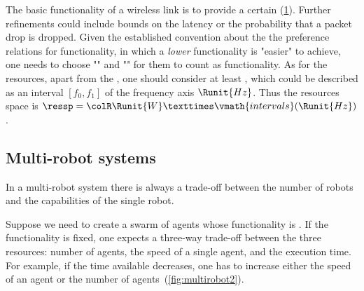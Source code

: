\begin{example}
  The basic functionality of a wireless link is to provide
  a certain  (\cref{fig:networklink}). Further refinements could include bounds
  on the latency or the probability that a packet drop is dropped. Given
  the established convention about the the preference relations for
  functionality, in which a \emph{lower} functionality is "easier"
  to achieve, one needs to choose ""
  and "" for them
  to count as functionality. As for the resources, apart from the , one should consider at least ,
  which could be described as an interval $[f_0,f_1]$ of the frequency
  axis $\Runit{Hz}$. Thus the resources space is $\ressp=\colR\Runit{W}×\vmath{intervals}(\Runit{Hz})$.
\end{example}

\begin{figure}[h]
  \begin{center}
  \end{center}
  \caption{ \label{fig:networklink}}
\end{figure}

\subsection{Multi-robot systems}

In a multi-robot system there is always a trade-off between the number
of robots and the capabilities of the single robot.
\begin{example}
  Suppose we need to create a swarm of agents whose functionality is
  . If the functionality is fixed, one expects
  a three-way trade-off between the three resources: number of agents,
  the speed of a single agent, and the execution time. For example,
  if the time available decreases, one has to increase either the speed
  of an agent or the number of agents~(\cref{fig:multirobot2}).
\end{example}

\begin{figure}[h]
  \caption{}
\end{figure}

